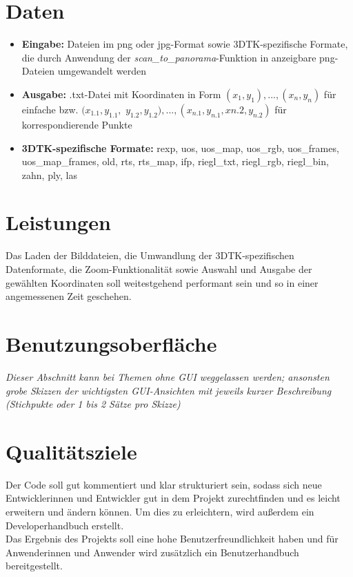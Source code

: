\documentclass[a4paper,10pt]{scrartcl}
\begin{document}
\section{Daten}\begin{itemize}
	\item \textbf{Eingabe:} Dateien im png oder jpg-Format sowie 3DTK-spezifische Formate, die durch Anwendung der \textit{scan\_to\_panorama}-Funktion in anzeigbare png-Dateien umgewandelt werden
	\item \textbf{Ausgabe:} .txt-Datei mit Koordinaten in Form $(x_1, y_1), ..., (x_n, y_n)$ für einfache bzw. $(x_{1.1}, y_{1.1},$ $  y_{1.2}, y_{1.2}),..., (x_{n.1}, y_{n.1}, x{n.2}, y_{n.2})$ für korrespondierende Punkte
	\item \textbf{3DTK-spezifische Formate:}	rexp, uos, uos\_map, uos\_rgb, uos\_frames, uos\_map\_frames, old, rts, 	rts\_map, ifp, riegl\_txt, riegl\_rgb, riegl\_bin, zahn, ply, las
	
\end{itemize}



\section{Leistungen}

Das Laden der Bilddateien, die Umwandlung der 3DTK-spezifischen Datenformate, die Zoom-Funktionalität sowie Auswahl und Ausgabe der gewählten Koordinaten soll weitestgehend performant sein und so in einer angemessenen Zeit geschehen.


\section{Benutzungsoberfläche}

\textit{Dieser Abschnitt kann bei Themen ohne GUI weggelassen werden; ansonsten grobe Skizzen der wichtigsten GUI-Ansichten mit jeweils kurzer Beschreibung (Stichpukte oder 1 bis 2 Sätze pro Skizze)}


\section{Qualitätsziele}

Der Code soll gut kommentiert und klar strukturiert sein, sodass sich neue Entwicklerinnen und Entwickler gut in dem Projekt zurechtfinden und es leicht erweitern und ändern können. Um dies zu erleichtern, wird außerdem ein Developerhandbuch erstellt.\\
Das Ergebnis des Projekts soll eine hohe Benutzerfreundlichkeit haben und für Anwenderinnen und Anwender wird zusätzlich ein Benutzerhandbuch bereitgestellt.
\end{document}
